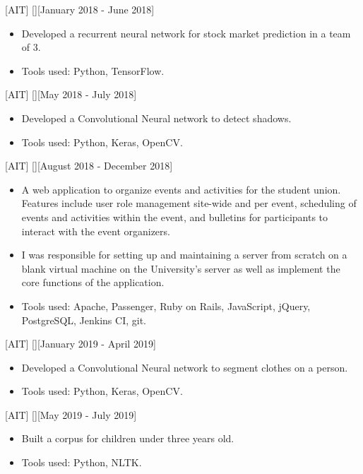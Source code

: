 \documentclass{article}
\begin{document}
[AIT]
[][January 2018 - June 2018]
\begin{itemize}
    \item Developed a recurrent neural network for stock market prediction in a team of 3.
    \item Tools used: Python, TensorFlow.
\end{itemize}

[AIT]
[][May 2018 - July 2018]
\begin{itemize}
    \item Developed a Convolutional Neural network to detect shadows.
    \item Tools used: Python, Keras, OpenCV.
\end{itemize}

[AIT]
[][August 2018 - December 2018]
\begin{itemize}
    \item A web application to organize events and activities for the student union. Features include user role management site-wide and per event, scheduling of events and activities within the event, and bulletins for participants to interact with the event organizers.
    \item  I was responsible for setting up and maintaining a server from scratch on a blank virtual machine on the University's server as well as implement the core functions of the application.
    \item Tools used: Apache, Passenger, Ruby on Rails, JavaScript, jQuery, PostgreSQL, Jenkins CI, git.
\end{itemize}

[AIT]
[][January 2019 - April 2019]
\begin{itemize}
    \item Developed a Convolutional Neural network to segment clothes on a person.
    \item Tools used: Python, Keras, OpenCV.
\end{itemize}

[AIT]
[][May 2019 - July 2019]
\begin{itemize}
    \item Built a corpus for children under three years old.
    \item Tools used: Python, NLTK.
\end{itemize}
\end{document}
